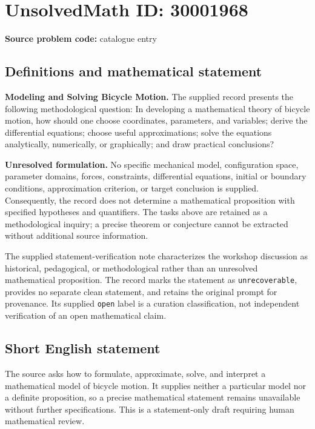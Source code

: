 \documentclass[11pt]{article}
\begin{document}
\section*{UnsolvedMath ID: 30001968}
\textbf{Source problem code:} catalogue entry
\subsection{Definitions and mathematical statement}
\textbf{Modeling and Solving Bicycle Motion.} The supplied record presents the following methodological question: In developing a mathematical theory of bicycle motion, how should one choose coordinates, parameters, and variables; derive the differential equations; choose useful approximations; solve the equations analytically, numerically, or graphically; and draw practical conclusions?

\textbf{Unresolved formulation.} No specific mechanical model, configuration space, parameter domains, forces, constraints, differential equations, initial or boundary conditions, approximation criterion, or target conclusion is supplied. Consequently, the record does not determine a mathematical proposition with specified hypotheses and quantifiers. The tasks above are retained as a methodological inquiry; a precise theorem or conjecture cannot be extracted without additional source information.

The supplied statement-verification note characterizes the workshop discussion as historical, pedagogical, or methodological rather than an unresolved mathematical proposition. The record marks the statement as \texttt{unrecoverable}, provides no separate clean statement, and retains the original prompt for provenance. Its supplied \texttt{open} label is a curation classification, not independent verification of an open mathematical claim.
\subsection{Short English statement}
The source asks how to formulate, approximate, solve, and interpret a mathematical model of bicycle motion. It supplies neither a particular model nor a definite proposition, so a precise mathematical statement remains unavailable without further specifications. This is a statement-only draft requiring human mathematical review.
\end{document}
